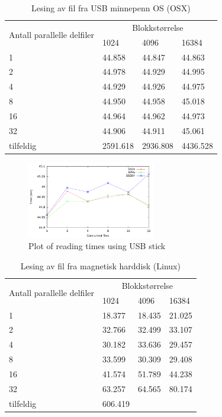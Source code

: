 \documentclass[titlepage]{article}
\begin{document}
\begin{table}%
\caption{Lesing av fil fra USB minnepenn OS (OSX)}
\label{USB}
\centering
\begin{tabular}{|l|l|l|l|}
\hline
\multirow{2}{*}{ Antall parallelle delfiler} & \multicolumn{3}{|c|}{Blokkstørrelse} \\
 & 1024 & 4096 & 16384\\
\hline
1         & 44.858 & 44.847 & 44.863\\
2         & 44.978 & 44.929 & 44.995\\
4         & 44.929 & 44.926 & 44.975\\
8         & 44.950 & 44.958 & 45.018\\
16        & 44.964 & 44.962 & 44.973\\
32        & 44.906 & 44.911 & 45.061\\
tilfeldig & 2591.618 & 2936.808 & 4436.528 \\
\hline
\end{tabular}
\end{table}

\begin{figure}%
  \caption{Plot of reading times using USB stick}
  \label{fig:usb}
  \centering
  \includegraphics[width=0.5\textwidth]{res/result-usb}
\end{figure}

\begin{table}%
\caption{Lesing av fil fra magnetisk harddisk (Linux)}
\label{HDD}
\centering
\begin{tabular}{|l|l|l|l|}
\hline
\multirow{2}{*}{ Antall parallelle delfiler} & \multicolumn{3}{|c|}{Blokkstørrelse} \\
 & 1024 & 4096 & 16384\\
\hline
1         & 18.377  & 18.435 & 21.025 \\
2         & 32.766  & 32.499 & 33.107 \\
4         & 30.182  & 33.636 & 29.457 \\
8         & 33.599  & 30.309 & 29.408 \\
16        & 41.574  & 51.789 & 44.238 \\
32        & 63.257  & 64.565 & 80.174 \\
tilfeldig & 606.419 &        &        \\
\hline
\end{tabular}
\end{table}
\end{document}
